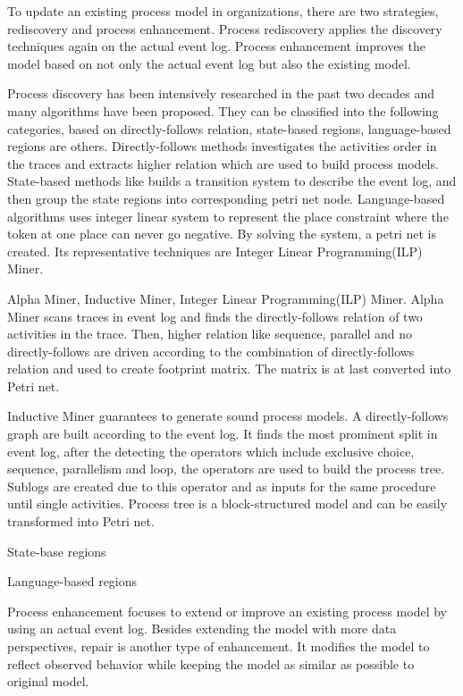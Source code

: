 To update an existing process model in organizations, there are two strategies, rediscovery and process enhancement. Process rediscovery applies the discovery techniques again on the actual event log. Process enhancement improves the model based on not only the actual event log but also the existing model. 

Process discovery has been intensively researched in the past two decades and many algorithms have been proposed. They can be classified into the following categories, based on directly-follows relation, state-based regions, language-based regions are others. Directly-follows methods investigates the activities order in the traces and extracts higher relation which are used to build process models. State-based methods like builds a transition system to describe the event log, and then group the state regions into corresponding petri net node. Language-based algorithms uses integer linear system to represent the place constraint where the token at one place can never go negative. By solving the system, a petri net is created. Its representative techniques are Integer Linear Programming(ILP) Miner\cite{van2008process}. 

Alpha Miner, Inductive Miner, Integer Linear Programming(ILP) Miner. Alpha Miner scans traces in event log and finds the directly-follows relation of two activities in the trace. Then, higher relation like sequence, parallel and no directly-follows are driven according to the combination of directly-follows relation and used to create footprint matrix. The matrix is at last converted into Petri net. 

Inductive Miner guarantees to generate sound process models. A directly-follows graph are built according to the event log. It finds the most prominent split in event log, after the detecting the operators which include exclusive choice, sequence, parallelism and loop, the operators are used to build the process tree. Sublogs are created due to this operator and as inputs for the same procedure until single activities. Process tree is a block-structured model and can be easily transformed into Petri net.  

State-base regions

Language-based regions
 
Process enhancement focuses to extend or improve an existing process model by using an actual event log\cite{van2011process}. Besides extending the model with more data perspectives, repair is another type of enhancement. It modifies the model to reflect observed behavior while keeping the model as similar as possible to original model.

